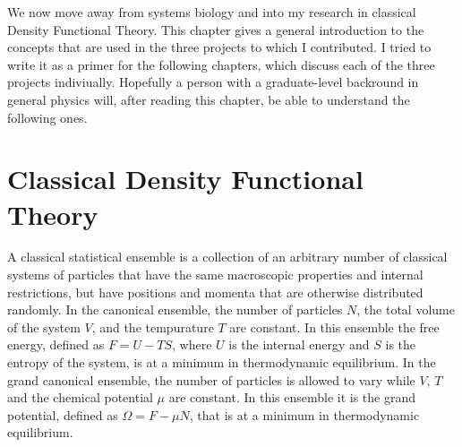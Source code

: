 \label{chapter:intro}
We now move away from systems biology and into my research in
classical Density Functional Theory.  This chapter gives a general
introduction to the concepts that are used in the three projects to
which I contributed.  I tried to write it as a primer for the
following chapters, which discuss each of the three projects
indiviually.  Hopefully a person with a graduate-level backround in
general physics will, after reading this chapter, be able to
understand the following ones.


\section{Classical Density Functional Theory}

A classical statistical ensemble is a collection of an arbitrary
number of classical systems of particles that have the same
macroscopic properties and internal restrictions, but have positions
and momenta that are otherwise distributed randomly.  In the canonical
ensemble, the number of particles $N$, the total volume of the system
$V$, and the tempurature $T$ are constant.  In this ensemble the free
energy, defined as $F = U - TS$, where $U$ is the internal energy and
$S$ is the entropy of the system, is at a minimum in thermodynamic
equilibrium. In the grand canonical ensemble, the number of particles
is allowed to vary while $V$, $T$ and the chemical potential $\mu$ are
constant.  In this ensemble it is the grand potential, defined as
$\Omega = F - \mu N$, that is at a minimum in thermodynamic
equilibrium.

